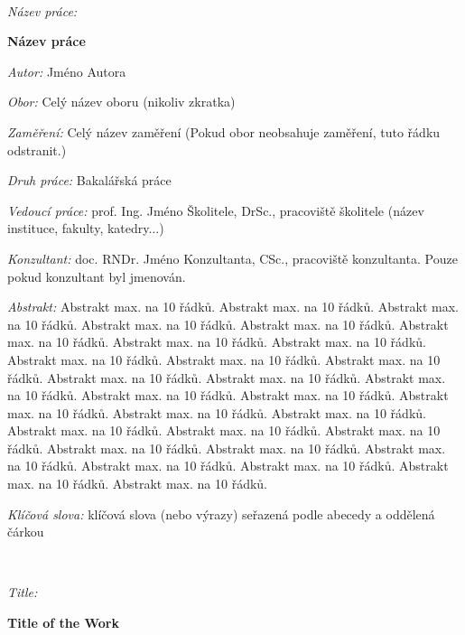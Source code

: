 \documentclass[a4paper,11pt]{book}
\begin{document}
\newpage{}

~\newpage{}

\begin{onehalfspace}
\noindent \emph{Název práce:}

\noindent \textbf{Název práce}
\end{onehalfspace}

\bigskip{}


\noindent \emph{Autor:} Jméno Autora

\bigskip{}


\noindent \emph{Obor:} Celý název oboru (nikoliv zkratka)\bigskip{}


\noindent \emph{Zaměření:} Celý název zaměření (Pokud obor neobsahuje
zaměření, tuto řádku odstranit.)

\bigskip{}


\noindent \emph{Druh práce:} Bakalářská práce

\bigskip{}


\noindent \emph{Vedoucí práce:} prof. Ing. Jméno Školitele, DrSc.,
pracoviště školitele (název instituce, fakulty, katedry...)

\bigskip{}


\noindent \emph{Konzultant:} doc. RNDr. Jméno Konzultanta, CSc., pracoviště
konzultanta. Pouze pokud konzultant byl jmenován.

\bigskip{}


\noindent \emph{Abstrakt:} Abstrakt max. na 10 řádků. Abstrakt max.
na 10 řádků. Abstrakt max. na 10 řádků. Abstrakt max. na 10 řádků.
Abstrakt max. na 10 řádků. Abstrakt max. na 10 řádků. Abstrakt max.
na 10 řádků. Abstrakt max. na 10 řádků. Abstrakt max. na 10 řádků.
Abstrakt max. na 10 řádků. Abstrakt max. na 10 řádků. Abstrakt max.
na 10 řádků. Abstrakt max. na 10 řádků. Abstrakt max. na 10 řádků.
Abstrakt max. na 10 řádků. Abstrakt max. na 10 řádků. Abstrakt max.
na 10 řádků. Abstrakt max. na 10 řádků. Abstrakt max. na 10 řádků.
Abstrakt max. na 10 řádků. Abstrakt max. na 10 řádků. Abstrakt max.
na 10 řádků. Abstrakt max. na 10 řádků. Abstrakt max. na 10 řádků.
Abstrakt max. na 10 řádků. Abstrakt max. na 10 řádků. Abstrakt max.
na 10 řádků. Abstrakt max. na 10 řádků. Abstrakt max. na 10 řádků. 

\bigskip{}


\noindent \emph{Klíčová slova:} klíčová slova (nebo výrazy) seřazená
podle abecedy a oddělená čárkou

\vfill{}
~

%
\begin{onehalfspace}
\noindent \emph{Title:}

\noindent \textbf{Title of the Work}
\end{onehalfspace}
\end{document}
